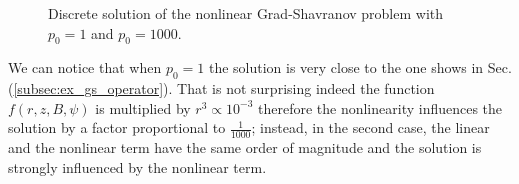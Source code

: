 \begin{figure}
\centering
{}
\caption{Discrete solution of the nonlinear Grad-Shavranov problem with $p_0=1$ and $p_0=1000$.}\label{fig:gs}
\end{figure}

We can notice that when $p_0=1$ the solution is very close to the one shows in Sec.(\ref{subsec:ex_gs_operator}). That is not surprising indeed the function $ f(r,z,B,\psi)$ is multiplied by $r^3\propto10^{-3}$ therefore the nonlinearity influences the solution by a factor proportional to $\frac{1}{1000}$; instead, in the second case, the linear and the nonlinear term have the same order of magnitude and the solution is strongly influenced by the nonlinear term.
